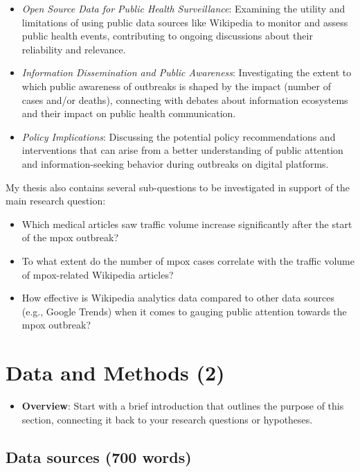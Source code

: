 \documentclass[
  12pt,
]{article}
\providecommand{\tightlist}{%
  \setlength{\itemsep}{0pt}\setlength{\parskip}{0pt}}\usepackage{longtable,booktabs,array}
\begin{document}
\begin{itemize}
\item
  \emph{Open Source Data for Public Health Surveillance}: Examining the
  utility and limitations of using public data sources like Wikipedia to
  monitor and assess public health events, contributing to ongoing
  discussions about their reliability and relevance.
\item
  \emph{Information Dissemination and Public Awareness}: Investigating
  the extent to which public awareness of outbreaks is shaped by the
  impact (number of cases and/or deaths), connecting with debates about
  information ecosystems and their impact on public health
  communication.
\item
  \emph{Policy Implications}: Discussing the potential policy
  recommendations and interventions that can arise from a better
  understanding of public attention and information-seeking behavior
  during outbreaks on digital platforms.
\end{itemize}

My thesis also contains several sub-questions to be investigated in
support of the main research question:

\begin{itemize}
\item
  Which medical articles saw traffic volume increase significantly after
  the start of the mpox outbreak?
\item
  To what extent do the number of mpox cases correlate with the traffic
  volume of mpox-related Wikipedia articles?
\item
  How effective is Wikipedia analytics data compared to other data
  sources (e.g., Google Trends) when it comes to gauging public
  attention towards the mpox outbreak?
\end{itemize}

\section{Data and Methods (2)}\label{data-and-methods-2}

\begin{itemize}
\tightlist
\item
  \textbf{Overview}: Start with a brief introduction that outlines the
  purpose of this section, connecting it back to your research questions
  or hypotheses.
\end{itemize}

\subsection{Data sources (700 words)}\label{data-sources-700-words}
\end{document}
